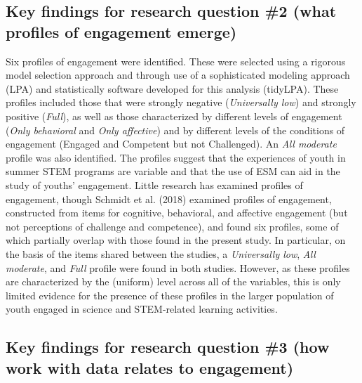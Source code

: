 \documentclass[]{book}
\theoremstyle{definition}
\theoremstyle{definition}
\theoremstyle{definition}
\theoremstyle{remark}
\begin{document}
\subsection{Key findings for research question \#2 (what profiles of
engagement
emerge)}\label{key-findings-for-research-question-2-what-profiles-of-engagement-emerge}

Six profiles of engagement were identified. These were selected using a
rigorous model selection approach and through use of a sophisticated
modeling approach (LPA) and statistically software developed for this
analysis (tidyLPA). These profiles included those that were strongly
negative (\emph{Universally low}) and strongly positive (\emph{Full}),
as well as those characterized by different levels of engagement
(\emph{Only behavioral} and \emph{Only affective}) and by different
levels of the conditions of engagement (Engaged and Competent but not
Challenged). An \emph{All moderate} profile was also identified. The
profiles suggest that the experiences of youth in summer STEM programs
are variable and that the use of ESM can aid in the study of youths'
engagement. Little research has examined profiles of engagement, though
Schmidt et al. (2018) examined profiles of engagement, constructed from
items for cognitive, behavioral, and affective engagement (but not
perceptions of challenge and competence), and found six profiles, some
of which partially overlap with those found in the present study. In
particular, on the basis of the items shared between the studies, a
\emph{Universally low}, \emph{All moderate}, and \emph{Full} profile
were found in both studies. However, as these profiles are characterized
by the (uniform) level across all of the variables, this is only limited
evidence for the presence of these profiles in the larger population of
youth engaged in science and STEM-related learning activities.

\subsection{Key findings for research question \#3 (how work with data
relates to
engagement)}\label{key-findings-for-research-question-3-how-work-with-data-relates-to-engagement}
\end{document}
